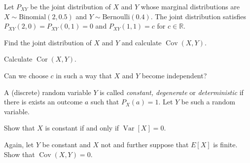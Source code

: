 \documentclass[a4paper,10pt,landscape,twocolumn]{scrartcl}
\DeclareMathOperator{\Cov}{Cov}
\DeclareMathOperator{\Cor}{Cor}
\DeclareMathOperator{\Var}{Var}
\begin{document}
\begin{exercise}[3pt]
Let $P_{XY}$ be the joint distribution of $X$ and $Y$ whose marginal distributions are $X \sim \text{Binomial}(2, 0.5)$ and $Y \sim \text{Bernoulli}(0.4)$. The joint distribution satisfies $P_{XY}(2,0) = P_{XY}(0,1) = 0$ and $P_{XY}(1,1) = c$ for $c\in \mathbb R$.

	\begin{subex}[1pt]
	Find the joint distribution of $X$ and $Y$ and calculate $\Cov(X,Y)$.
	\end{subex}
	
	\begin{subex}[1pt]
	Calculate $\Cor(X,Y)$.	
	\end{subex}
	
	\begin{subex}[1pt]
	Can we choose $c$ in such a way that $X$ and $Y$ become independent?	
	\end{subex}
\end{exercise}


\begin{exercise}
A (discrete) random variable $Y$ is called \emph{constant, degenerate} or \emph{deterministic} if there is exists an outcome $a$ such that $P_X(a) = 1$. Let $Y$ be such a random variable.

	\begin{subex}[1pt]
		Show that $X$ is constant if and only if $\Var[X] = 0$.	
	\end{subex}
	
	\begin{subex}[1pt]
		Again, let $Y$ be constant and $X$ not and further suppose that $E[X]$ is finite. Show that $\Cov(X,Y) = 0$.	
	\end{subex}
\end{exercise}


\end{document}
